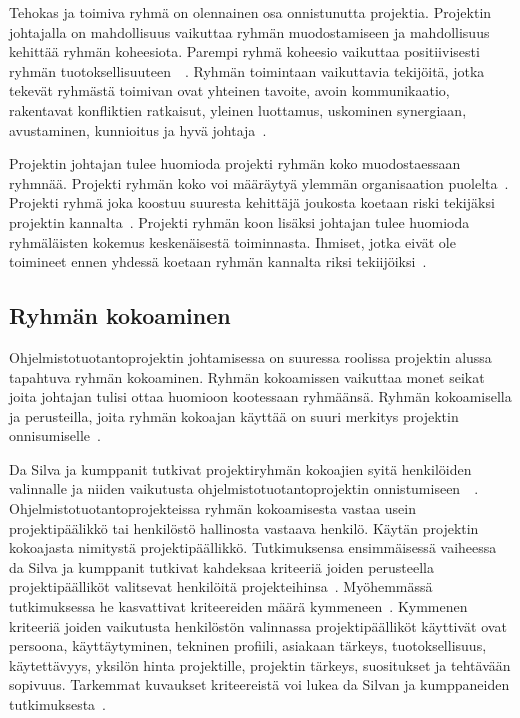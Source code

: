 \documentclass[finnish]{tktltiki2}
\theoremstyle{definition}
\theoremstyle{remark}
\begin{document}
Tehokas ja toimiva ryhmä on olennainen osa onnistunutta projektia. Projektin johtajalla on mahdollisuus vaikuttaa ryhmän muodostamiseen ja mahdollisuus kehittää ryhmän koheesiota. Parempi ryhmä koheesio vaikuttaa positiivisesti ryhmän tuotoksellisuuteen~\cite{bahli2005group}~\cite{McLeod:2011:FAS:1978802.1978803}. Ryhmän toimintaan vaikuttavia tekijöitä, jotka tekevät ryhmästä toimivan ovat yhteinen tavoite, avoin kommunikaatio, rakentavat konfliktien ratkaisut, yleinen luottamus, uskominen synergiaan, avustaminen, kunnioitus ja hyvä johtaja~\cite{4017705}.

Projektin johtajan tulee huomioda projekti ryhmän koko muodostaessaan ryhmnää. Projekti ryhmän koko voi määräytyä ylemmän organisaation puolelta~\cite{McLeod:2011:FAS:1978802.1978803}. Projekti ryhmä joka koostuu suuresta kehittäjä joukosta koetaan riski tekijäksi projektin kannalta~\cite{McLeod:2011:FAS:1978802.1978803}. Projekti ryhmän koon lisäksi johtajan tulee huomioda ryhmäläisten kokemus keskenäisestä toiminnasta. Ihmiset, jotka eivät ole toimineet ennen yhdessä koetaan ryhmän kannalta riksi tekiijöiksi~\cite{McLeod:2011:FAS:1978802.1978803}.



\subsection{Ryhmän kokoaminen}


Ohjelmistotuotantoprojektin johtamisessa on suuressa roolissa projektin alussa tapahtuva ryhmän kokoaminen. Ryhmän kokoamissen vaikuttaa monet seikat joita johtajan tulisi ottaa huomioon kootessaan ryhmäänsä. Ryhmän kokoamisella ja perusteilla, joita ryhmän kokoajan käyttää on suuri merkitys projektin onnisumiselle~\cite{daSilva2012}. 

Da Silva ja kumppanit tutkivat projektiryhmän kokoajien syitä henkilöiden valinnalle ja niiden vaikutusta ohjelmistotuotantoprojektin onnistumiseen~\cite{daSilva2012}~\cite{francca2009quantitative}. Ohjelmistotuotantoprojekteissa ryhmän kokoamisesta vastaa usein projektipäälikkö tai henkilöstö hallinosta vastaava henkilö. Käytän projektin kokoajasta nimitystä projektipäällikkö. Tutkimuksensa ensimmäisessä vaiheessa da Silva ja kumppanit tutkivat kahdeksaa kriteeriä joiden perusteella projektipäälliköt valitsevat henkilöitä projekteihinsa~\cite{francca2009quantitative}. Myöhemmässä tutkimuksessa he kasvattivat kriteereiden määrä kymmeneen~\cite{daSilva2012}. Kymmenen kriteeriä joiden vaikutusta henkilöstön valinnassa projektipäälliköt käyttivät ovat persoona, käyttäytyminen, tekninen profiili, asiakaan tärkeys, tuotoksellisuus, käytettävyys, yksilön hinta projektille, projektin tärkeys, suositukset ja tehtävään sopivuus. Tarkemmat kuvaukset kriteereistä voi lukea da Silvan ja kumppaneiden tutkimuksesta~\cite{daSilva2012}.
\end{document}

